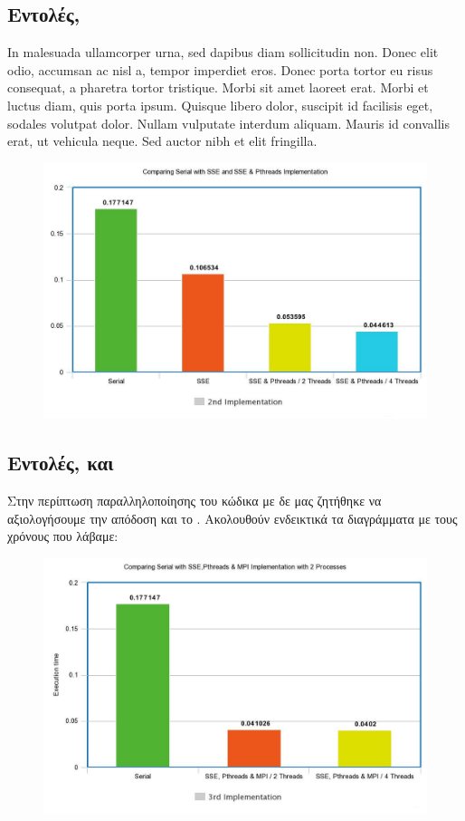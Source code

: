 \documentclass{article}
\begin{document}
\newpage
\subsection{ Εντολές, }

In malesuada ullamcorper urna, sed dapibus diam sollicitudin non. Donec elit odio, accumsan ac nisl a, tempor imperdiet eros. Donec porta tortor eu risus consequat, a pharetra tortor tristique. Morbi sit amet laoreet erat. Morbi et luctus diam, quis porta ipsum. Quisque libero dolor, suscipit id facilisis eget, sodales volutpat dolor. Nullam vulputate interdum aliquam. Mauris id convallis erat, ut vehicula neque. Sed auctor nibh et elit fringilla.

\begin{figure}[h!]
\centering
  \includegraphics[width=0.8\linewidth]{SSE_PTHREADS.jpeg}
  \caption{}
\end{figure}

\newpage
\subsection{ Εντολές,  και  }

Στην περίπτωση παραλληλοποίησης του κώδικα με  δε μας ζητήθηκε να αξιολογήσουμε την απόδοση και το . Ακολουθούν ενδεικτικά τα διαγράμματα με τους χρόνους που 
λάβαμε:
\vspace{5mm}
\begin{figure}[h!]
\centering 
  \includegraphics[width=0.8\linewidth]{MPI2.jpeg}
  \caption{ }
\end{figure}
\end{document}
